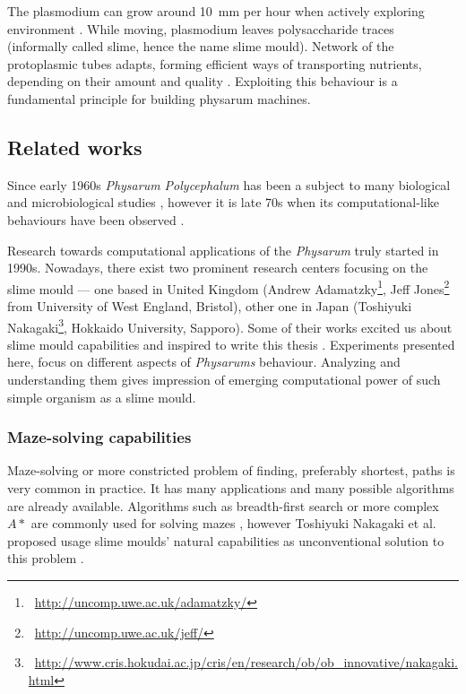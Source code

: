 The plasmodium can grow around 10~mm per hour when actively exploring environment \cite{coggin1996dynamic}. While moving, plasmodium leaves polysaccharide traces (informally called slime, hence the name slime mould). Network of the protoplasmic tubes adapts, forming efficient ways of transporting nutrients, depending on their amount and quality \cite{nakagaki2004obtaining}. Exploiting this behaviour is a fundamental principle for building physarum machines.


\subsection{Related works}

Since early 1960s \textit{Physarum Polycephalum} has been a subject to many biological and microbiological studies \cite{guttes1964mitotic,daniel1962method}, however it is late 70s when its computational-like behaviours have been observed \cite{wohlfarth1979oscillatory}.

Research towards computational applications of the \textit{Physarum} truly started in 1990s. Nowadays, there exist two prominent research centers focusing on the slime mould --- one based in United Kingdom (Andrew Adamatzky\footnote{~\url{http://uncomp.uwe.ac.uk/adamatzky/}}, Jeff Jones\footnote{~\url{http://uncomp.uwe.ac.uk/jeff/}} from University of West England, Bristol), other one in Japan (Toshiyuki Nakagaki\footnote{~\url{http://www.cris.hokudai.ac.jp/cris/en/research/ob/ob\_innovative/nakagaki.html}}, Hokkaido University, Sapporo). Some of their works excited us about slime mould capabilities and inspired to write this thesis \cite{nakagaki2000intelligence,adamatzky2010physarum,jones2015pattern,adamatzky2007physarum}. Experiments presented here, focus on different aspects of \textit{Physarums} behaviour. Analyzing and understanding them gives impression of emerging computational power of such simple organism as a slime mould.


\subsubsection{Maze-solving capabilities}

Maze-solving or more constricted problem of finding, preferably shortest, paths is very common in practice. It has many applications and many possible algorithms are already available. Algorithms such as breadth-first search or more complex $A*$ are commonly used for solving mazes \cite{zelkowitz1979principles}, however Toshiyuki Nakagaki et al. proposed usage slime moulds' natural capabilities as unconventional solution to this problem \cite{nakagaki2000intelligence}.

